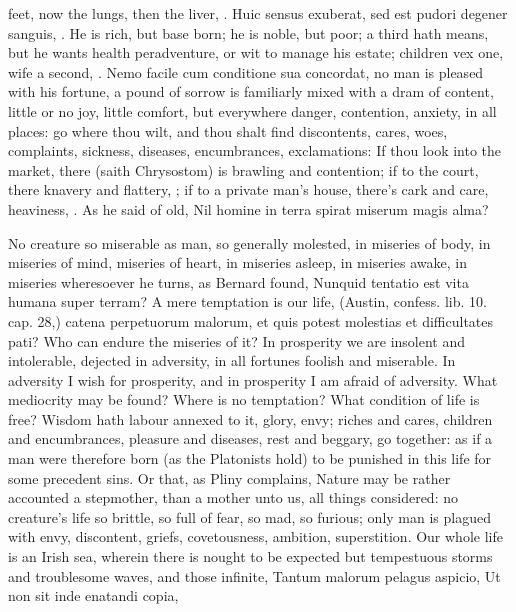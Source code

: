 {feet, now the lungs, then the liver, \etc{}. Huic sensus exuberat, sed est
pudori degener sanguis, \etc{}. He is rich, but base born; he is noble, but
poor; a third hath means, but he wants health peradventure, or wit to
manage his estate; children vex one, wife a second, \etc{}. Nemo facile cum
conditione sua concordat, no man is pleased with his fortune, a pound
of sorrow is familiarly mixed with a dram of content, little or no joy,
little comfort, but everywhere danger, contention, anxiety, in
all places: go where thou wilt, and thou shalt find discontents, cares,
woes, complaints, sickness, diseases, encumbrances, exclamations: If
thou look into the market, there (saith  Chrysostom) is brawling
and contention; if to the court, there knavery and flattery, \etc{}; if to
a private man's house, there's cark and care, heaviness, \etc{}. As he said
of old,
Nil homine in terra spirat miserum magis alma?

No creature so miserable as man, so generally molested, in
miseries of body, in miseries of mind, miseries of heart, in miseries
asleep, in miseries awake, in miseries wheresoever he turns, as Bernard
found, Nunquid tentatio est vita humana super terram? A mere temptation
is our life, (Austin, confess. lib. 10. cap. 28,) catena perpetuorum
malorum, et quis potest molestias et difficultates pati? Who can endure
the miseries of it? In prosperity we are insolent and
intolerable, dejected in adversity, in all fortunes foolish and
miserable. In adversity I wish for prosperity, and in prosperity
I am afraid of adversity. What mediocrity may be found? Where is no
temptation? What condition of life is free? Wisdom hath labour
annexed to it, glory, envy; riches and cares, children and
encumbrances, pleasure and diseases, rest and beggary, go together: as
if a man were therefore born (as the Platonists hold) to be punished in
this life for some precedent sins. Or that, as Pliny complains,
Nature may be rather accounted a stepmother, than a mother unto us, all
things considered: no creature's life so brittle, so full of fear, so
mad, so furious; only man is plagued with envy, discontent, griefs,
covetousness, ambition, superstition. Our whole life is an Irish sea,
wherein there is nought to be expected but tempestuous storms and
troublesome waves, and those infinite,
Tantum malorum pelagus aspicio,
Ut non sit inde enatandi copia,

}
